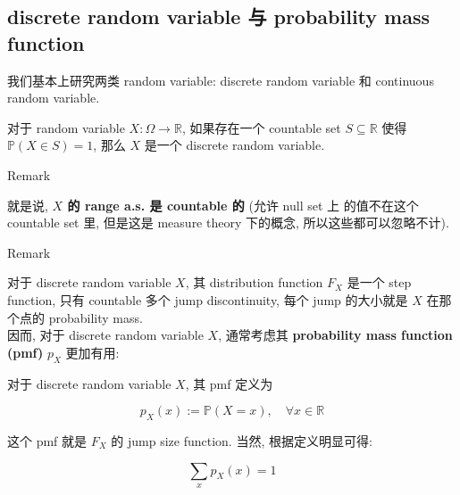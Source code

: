 \subsection{discrete random variable 与 probability mass function}\label{discrete-random-variable-ux4e0e-probability-mass-function}

我们基本上研究两类 random variable: discrete random variable 和 continuous random variable.

\begin{definition}{}

对于 random variable \(\mathit{X}:\Omega\rightarrow\mathbb{R}\), 如果存在一个 countable set \(\mathit{S} \subseteq \mathbb{R}\) 使得 \(\mathbb{P}(\mathit{X} \in \mathit{S}) = 1\), 那么 \(\mathit{X}\) 是一个 discrete random variable.

\end{definition}

\begin{qlremark}{Remark}

就是说, \textbf{\(\mathit{X}\) 的 range a.s. 是 countable 的} (允许 null set 上 的值不在这个 countable set 里, 但是这是 measure theory 下的概念, 所以这些都可以忽略不计).

\end{qlremark}

\begin{qlremark}{Remark}

对于 discrete random variable \(\mathit{X}\), 其 distribution function \(\mathit{F}_{\mathit{X}}\) 是一个 step function, 只有 countable 多个 jump discontinuity, 每个 jump 的大小就是 \(\mathit{X}\) 在那个点的 probability mass.\\
因而, 对于 discrete random variable \(\mathit{X}\), 通常考虑其 \textbf{probability mass function (pmf)} \(\mathit{p}_{\mathit{X}}\) 更加有用:

\begin{definition}{}

对于 discrete random variable \(\mathit{X}\), 其 pmf 定义为

\[\mathit{p}_{\mathit{X}}(\mathit{x}) := \mathbb{P}(\mathit{X} = \mathit{x}),\quad\forall\mathit{x} \in \mathbb{R}\]

\end{definition}

这个 pmf 就是 \(\mathit{F}_{\mathit{X}}\) 的 jump size function. 当然, 根据定义明显可得:

\[\sum\limits_{\mathit{x}}\mathit{p}_{\mathit{X}}(\mathit{x}) = 1\]

\end{qlremark}

